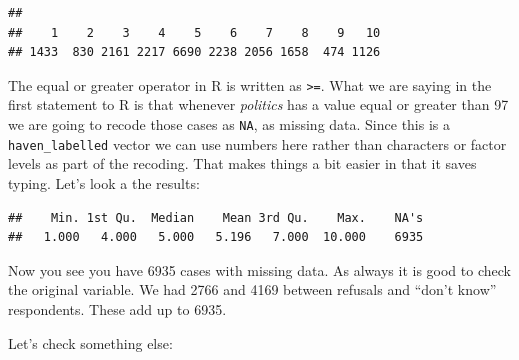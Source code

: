 \documentclass[
]{book}
\newenvironment{Shaded}{\begin{snugshade}}{\end{snugshade}}
\newcommand{\ConstantTok}[1]{\textcolor[rgb]{0.00,0.00,0.00}{#1}}
\newcommand{\DecValTok}[1]{\textcolor[rgb]{0.00,0.00,0.81}{#1}}
\newcommand{\FunctionTok}[1]{\textcolor[rgb]{0.00,0.00,0.00}{#1}}
\newcommand{\NormalTok}[1]{#1}
\newcommand{\OtherTok}[1]{\textcolor[rgb]{0.56,0.35,0.01}{#1}}
\newcommand{\SpecialCharTok}[1]{\textcolor[rgb]{0.00,0.00,0.00}{#1}}
\begin{document}
\begin{Shaded}
\end{Shaded}

\begin{verbatim}
## 
##    1    2    3    4    5    6    7    8    9   10 
## 1433  830 2161 2217 6690 2238 2056 1658  474 1126
\end{verbatim}

The equal or greater operator in R is written as \texttt{\textgreater{}=}. What we are saying in the first statement to R is that whenever \emph{politics} has a value equal or greater than 97 we are going to recode those cases as \texttt{NA}, as missing data. Since this is a \texttt{haven\_labelled} vector we can use numbers here rather than characters or factor levels as part of the recoding. That makes things a bit easier in that it saves typing.
Let's look a the results:

\begin{Shaded}
\end{Shaded}

\begin{verbatim}
##    Min. 1st Qu.  Median    Mean 3rd Qu.    Max.    NA's 
##   1.000   4.000   5.000   5.196   7.000  10.000    6935
\end{verbatim}

Now you see you have 6935 cases with missing data. As always it is good to check the original variable. We had 2766 and 4169 between refusals and ``don't know'' respondents. These add up to 6935.

Let's check something else:

\begin{Shaded}
\end{Shaded}
\end{document}
